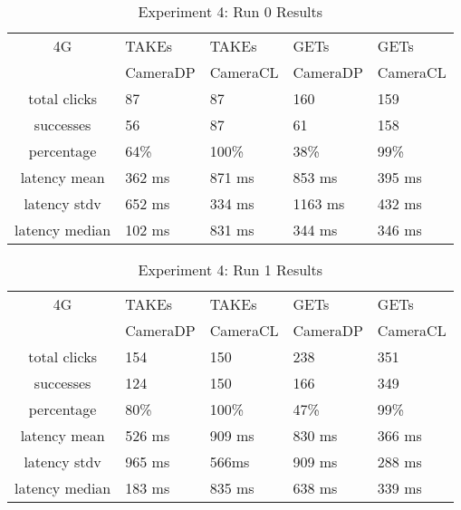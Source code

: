 \begin{table}[htb]
\begin{scriptsize} 
\caption{Experiment 4: Run 0 Results} 
\label{table:exp-4-run0-results}
 \begin{center}
 \begin{tabular}{| c | p{1.5cm} | p{1.5cm} | p{1.5cm} | p{1.4cm} |}
  \hline
  4G & TAKEs & TAKEs & GETs & GETs \\
  & CameraDP & CameraCL & CameraDP & CameraCL \\
  \hline
  total clicks & 87 & 87 & 160 & 159 \\
  \hline
  successes & 56 & 87 & 61 & 158 \\
  \hline
  percentage & 64\% & 100\% & 38\% & 99\% \\
  \hline
  latency mean & 362 ms & 871 ms & 853 ms & 395 ms \\
  \hline
  latency stdv & 652 ms &334 ms &1163 ms & 432 ms \\
  \hline
  latency median & 102 ms & 831 ms & 344 ms & 346 ms \\
  \hline
  \end{tabular}

  \end{center}
\end{scriptsize}
\end{table}

\begin{table}[htb]
\begin{scriptsize} 
\caption{Experiment 4: Run 1 Results} 
\label{table:exp-4-run1-results}
 \begin{center}
 \begin{tabular}{| c | p{1.5cm} | p{1.5cm} | p{1.5cm} | p{1.4cm} |}
  \hline
  4G & TAKEs & TAKEs & GETs & GETs \\
  & CameraDP & CameraCL & CameraDP & CameraCL \\
  \hline
  total clicks & 154 & 150 & 238 & 351 \\
  \hline
  successes & 124 & 150 & 166 & 349 \\
  \hline
  percentage & 80\% & 100\% & 47\% & 99\% \\
  \hline
  latency mean & 526 ms & 909 ms & 830 ms & 366 ms \\
  \hline
  latency stdv & 965 ms & 566ms & 909 ms & 288 ms \\
  \hline
  latency median & 183 ms & 835 ms & 638 ms & 339 ms \\
  \hline
  \end{tabular}
  \end{center}
\end{scriptsize}
\end{table}

